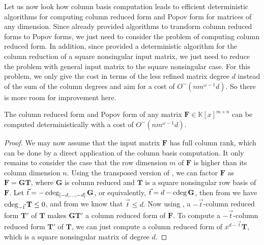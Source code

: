 Let us now look how column basis computation leads to efficient deterministic
algorithms for computing column reduced form and Popov form for matrices
of any dimension. Since \citet{SS2011} already provided algorithms
to transform column reduced forms to Popov forms, we just need to
consider the problem of computing column reduced form. In addition,
since \citet{GSSV2012} provided a deterministic algorithm for the
column reduction of a square nonsingular input matrix, we just need
to reduce the problem with general input matrix to the square nonsingular
case. For this problem, we only give the cost in terms of the less
refined matrix degree $d$ instead of the sum of the column degrees
and aim for a cost of $O^{\sim}\left(nm^{\omega-1}d\right)$. So there
is more room for improvement here.
\begin{thm}
The column reduced form and Popov form of any matrix $\mathbf{F}\in\mathbb{K}\left[x\right]^{m\times n}$
can be computed deterministically with a cost of $O^{\sim}\left(nm^{\omega-1}d\right).$\end{thm}
\begin{proof}
We may now assume that the input matrix $\mathbf{F}$ has full column
rank, which can be done by a direct application of the column basis
computation. It only remains to consider the case that the row dimension
$m$ of $\mathbf{F}$ is higher than its column dimension $n$. Using
the transposed version of , we can factor
$\mathbf{F}$ as $\mathbf{F}=\mathbf{G}\mathbf{T}$, where $\mathbf{G}$
is column reduced and $\mathbf{T}$ is a square nonsingular row basis
of $\mathbf{F}$. Let $\vec{t}=-\cdeg_{\left[-d,\dots,-d\right]}\mathbf{G}$,
or equivalently, $\vec{t}=d-\cdeg\mathbf{G}$, then from 
we have $\cdeg_{-\vec{t}}\mathbf{T}\le0$, and from 
we know that $\vec{t}\le d$. Now using ,
a $-\vec{t}$-column reduced form $\mathbf{T}'$ of $\mathbf{T}$
makes $\mathbf{G}\mathbf{T}'$ a column reduced form of $\mathbf{F}$.
To compute a $-\vec{t}$-column reduced form $\mathbf{T}'$ of $\mathbf{T}$,
we can just compute a column reduced form of $x^{d-\vec{t}}\mathbf{T}$,
which is a square nonsingular matrix of degree $d$.\end{proof}
